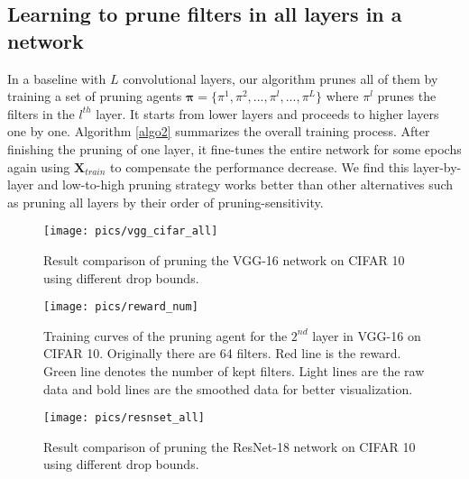 \documentclass[10pt,twocolumn,letterpaper]{article}
\begin{document}
\subsection{Learning to prune filters in all layers in a network}

In a baseline with $L$ convolutional layers, our algorithm prunes all of them by training a set of pruning agents $\boldsymbol{\pi} = \{ \pi^1, \pi^2, ..., \pi^l, ..., \pi^L   \}$ where $\pi^l$ prunes the filters in the $l^{th}$ layer. It starts from lower layers and proceeds to higher layers one by one. Algorithm \ref{algo2} summarizes the overall training process. After finishing the pruning of one layer, it fine-tunes the entire network for some epochs again using $\mathbf{X}_{train}$ to compensate the performance decrease. We find this layer-by-layer and low-to-high pruning strategy works better than other alternatives such as pruning all layers by their order of pruning-sensitivity. 










\begin{figure}
\begin{center}
   \texttt{[image: pics/vgg\_cifar\_all]}
\end{center}
   \caption{Result comparison of pruning the VGG-16 network on CIFAR 10 using different drop bounds.}
\label{fig:vgg_cifar_in}
\end{figure}

\begin{figure}
\begin{center}
   \texttt{[image: pics/reward\_num]}
\end{center}
   \caption{Training curves of the pruning agent for the $2^{nd}$ layer in VGG-16 on CIFAR 10. Originally there are 64 filters. Red line is the reward. Green line denotes the number of kept filters. Light lines are the raw data and bold lines are the smoothed data for better visualization.}
\label{fig:tc}
\end{figure}



\begin{figure}[h]
  \centering
  \captionsetup{justification=centering}
  \centering
  \texttt{[image: pics/resnset\_all]}
  \label{fig:vgg_cifar_in}
   \caption{Result comparison of pruning the ResNet-18 network on CIFAR 10 using different drop bounds.}
\label{fig:resnet}
\end{figure}
\end{document}
